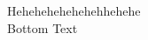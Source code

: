 
\usepackage{tabularx}
\usepackage{systeme}
\usepackage{centernot}

\enablemath


Hehehehehehehehhehehe\\
Bottom Text

%
%
